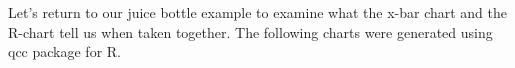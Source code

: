 \documentclass{ximera}
\begin{document}
Let's return to our juice bottle example to examine what the x-bar chart and the R-chart tell us when taken together.  The following charts were generated using qcc package for R.

\begin{center}
       \end{center}

\end{document}
